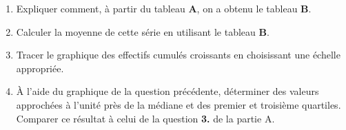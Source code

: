 \bigskip
\begin{enumerate}
     \item %
     Expliquer comment, à partir du tableau \textbf{A}, on a obtenu le tableau \textbf{B}.
     \item %
     Calculer la moyenne de cette série en utilisant le tableau \textbf{B}.
     \item %
     Tracer le graphique des effectifs cumulés croissants en choisissant une échelle appropriée.
     \item %
     \`A l'aide du graphique de la question précédente, déterminer des valeurs approchées à l'unité près de la médiane et des premier et troisième quartiles.\\
     Comparer ce résultat à celui de la question \textbf{3.} de la partie A.
\end{enumerate}
